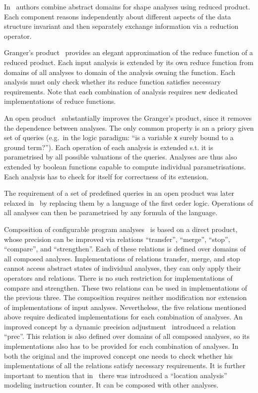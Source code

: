 \documentclass[envcountsame]{llncs}
\begin{document}
In~\cite{ProductShapes} authors combine abstract domains for shape analyses
using reduced product. Each component reasons independently about different
aspects of the data structure invariant and then separately exchange information
via a reduction operator.

Granger's product~\cite{GrangerProduct} provides an elegant approximation of the
reduce function of a reduced product. Each input analysis is extended by its own
reduce function from domains of all analyses to domain of the analysis owning
the function. Each analysis must only check whether its reduce function
satisfies necessary requirements. Note that each combination of analysis
requires new dedicated implementations of reduce functions.

An open product~\cite{OpenProduct} substantially improves the Granger's product,
since it removes the dependence between analyses. The only common property is an
a priory given set of queries (e.g.~in the logic paradigm: ``is a variable
\texttt{x} surely bound to a ground term?''). Each operation of each analysis is
extended s.t. it is parametrised by all possible valuations of the queries.
Analyses are thus also extended by boolean functions capable to compute
individual parametrisations. Each analysis has to check for itself for
correctness of its extension.

The requirement of a set of predefined queries in an open product was later
relaxed in~\cite{InteractingPlugins} by replacing them by a language of the
first order logic. Operations of all analyses can then be parametrised by any
formula of the language.

Composition of configurable program analyses~\cite{CPA} is based on a direct
product, whose precision can be improved via relations ``transfer'', ``merge'',
``stop'', ``compare'', and ``strengthen''. Each of these relations is defined
over domains of all composed analyses. Implementations of relations transfer,
merge, and stop cannot access abstract states of individual analyses, they can
only apply their operators and relations. There is no such restriction for
implementations of compare and strengthen. These two relations can be used in
implementations of the previous three. The composition requires neither
modification nor extension of implementations of input analyses. Nevertheless,
the five relations mentioned above require dedicated implementations for each
combination of analyses. An improved concept by a dynamic precision
adjustment~\cite{CPAplus} introduced a relation ``prec''. This relation is also
defined over domains of all composed analyses, so its implementations also has
to be provided for each combination of analyses. In both the original and the
improved concept one needs to check whether his implementations of all the
relations satisfy necessary requirements. It is further important to mention
that in~\cite{CPA} there was introduced a ``location analysis'' modeling
instruction counter. It can be composed with other analyses.
\end{document}
